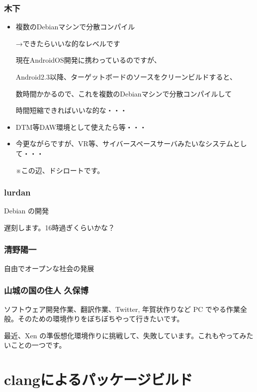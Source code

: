 \documentclass[cjk,dvipdfmx,10pt,%
hyperref={bookmarks=true,bookmarksnumbered=true,bookmarksopen=false,%
colorlinks=false,%
pdftitle={第 64 回 関西 Debian 勉強会},%
pdfauthor={倉敷・のがた・佐々木・かわだ},%
pdfsubject={資料},%
}]{beamer}
\begin{document}
\begin{frame}
  \frametitle{ 木下 }
  \begin{itemize}
  \item 複数のDebianマシンで分散コンパイル

    →できたらいいな的なレベルです

    現在AndroidOS開発に携わっているのですが、

    Android2.3以降、ターゲットボードのソースをクリーンビルドすると、

    数時間かかるので、これを複数のDebianマシンで分散コンパイルして

    時間短縮できればいいな的な・・・
  \item DTM等DAW環境として使えたら等・・・
  \item 今更ながらですが、VR等、サイバースペースサーバみたいなシステムとして・・・

    ※この辺、ドシロートです。
  \end{itemize}
\end{frame}

\begin{frame}
  \frametitle{ lurdan }
Debian の開発

遅刻します。16時過ぎくらいかな？
\end{frame}

\begin{frame}
  \frametitle{ 清野陽一 }
自由でオープンな社会の発展
\end{frame}

\begin{frame}
  \frametitle{ 山城の国の住人 久保博 }
ソフトウェア開発作業、翻訳作業、Twitter, 年賀状作りなど PC でやる作業全般。そのための環境作りをぼちぼちやって行きたいです。

最近、Xen の準仮想化環境作りに挑戦して、失敗しています。これもやってみたいことの一つです。
\end{frame}


\section{clangによるパッケージビルド}

\end{document}
